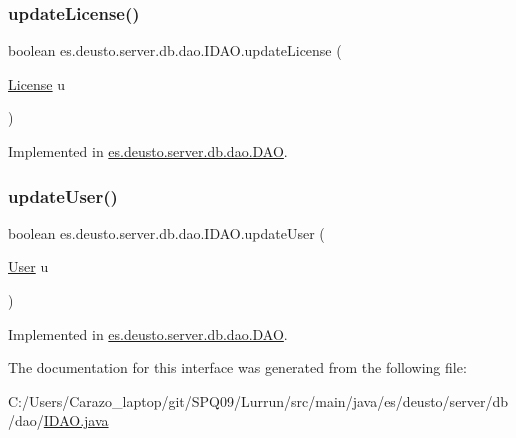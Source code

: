 \subsubsection{\texorpdfstring{update\+License()}{updateLicense()}}
{\footnotesize\ttfamily boolean es.\+deusto.\+server.\+db.\+dao.\+I\+D\+A\+O.\+update\+License (\begin{DoxyParamCaption}\item[{\hyperlink{classes_1_1deusto_1_1server_1_1db_1_1data_1_1_license}{License}}]{u }\end{DoxyParamCaption})}



Implemented in \hyperlink{classes_1_1deusto_1_1server_1_1db_1_1dao_1_1_d_a_o_a98774e8d93cdd4d8d104a197bd37d4e1}{es.\+deusto.\+server.\+db.\+dao.\+D\+AO}.

\mbox{\label{interfacees_1_1deusto_1_1server_1_1db_1_1dao_1_1_i_d_a_o_a790b00e2989b634c1bbb2c6620ff3583}} 
\subsubsection{\texorpdfstring{update\+User()}{updateUser()}}
{\footnotesize\ttfamily boolean es.\+deusto.\+server.\+db.\+dao.\+I\+D\+A\+O.\+update\+User (\begin{DoxyParamCaption}\item[{\hyperlink{classes_1_1deusto_1_1server_1_1db_1_1data_1_1_user}{User}}]{u }\end{DoxyParamCaption})}



Implemented in \hyperlink{classes_1_1deusto_1_1server_1_1db_1_1dao_1_1_d_a_o_a7f6ed77294fe1f61cbebbea410cef6e0}{es.\+deusto.\+server.\+db.\+dao.\+D\+AO}.



The documentation for this interface was generated from the following file\+:\begin{DoxyCompactItemize}
\item 
C\+:/\+Users/\+Carazo\+\_\+laptop/git/\+S\+P\+Q09/\+Lurrun/src/main/java/es/deusto/server/db/dao/\hyperlink{_i_d_a_o_8java}{I\+D\+A\+O.\+java}\end{DoxyCompactItemize}
